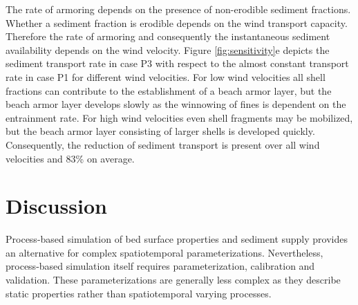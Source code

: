 
The rate of armoring depends on the presence of non-erodible sediment
fractions. Whether a sediment fraction is erodible depends on the wind
transport capacity. Therefore the rate of armoring and consequently
the instantaneous sediment availability depends on the wind
velocity. Figure \ref{fig:sensitivity}e depicts the sediment transport
rate in case P3 with respect to the almost constant transport rate in
case P1 for different wind velocities. For low wind velocities all
shell fractions can contribute to the establishment of a beach armor
layer, but the beach armor layer develops slowly as the winnowing of
fines is dependent on the entrainment rate. For high wind velocities
even shell fragments may be mobilized, but the beach armor layer
consisting of larger shells is developed quickly. Consequently, the
reduction of sediment transport is present over all wind velocities
and 83\% on average.


\section{Discussion}

Process-based simulation of bed surface properties and sediment supply
provides an alternative for complex spatiotemporal
parameterizations. Nevertheless, process-based simulation itself
requires parameterization, calibration and validation. These
parameterizations are generally less complex as they describe static
properties rather than spatiotemporal varying processes.

